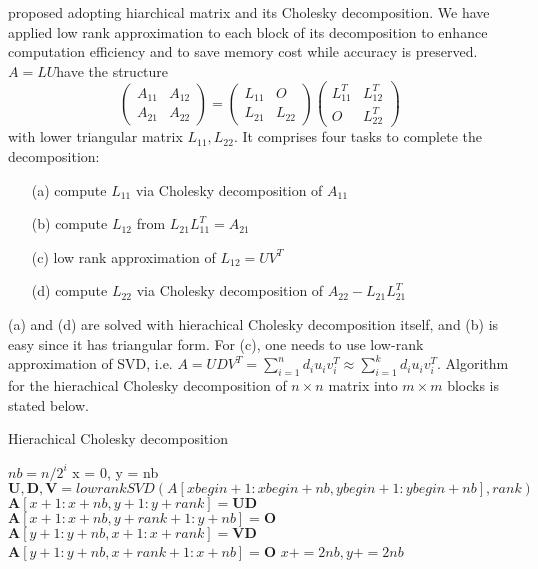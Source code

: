 \citet{hackbusch2015hierarchical} proposed adopting hiarchical matrix and its Cholesky decomposition. We have applied low rank approximation to each block of its decomposition to enhance computation efficiency and to save memory cost while accuracy is preserved.
$A=LU$have the structure
$$\begin{pmatrix}A_{11}&A_{12}\\A_{21}&A_{22}\end{pmatrix}=\begin{pmatrix}L_{11}&O\\L_{21}&L_{22}\end{pmatrix}\begin{pmatrix}L_{11}^T&L_{12}^T\\O&L_{22}^T\end{pmatrix}$$
with lower triangular matrix $L_{11},L_{22}$.
It comprises four tasks to complete the decomposition:
\begin{itemize}
	\item[(a)] compute $L_{11}$ via Cholesky decomposition of $A_{11}$
	\item[(b)] compute $L_{12}$ from $L_{21}L_{11}^T = A_{21}$
	\item[(c)] low rank approximation of $L_{12}=UV^T$
	\item[(d)] compute $L_{22}$ via Cholesky decomposition of $A_{22}-L_{21}L_{21}^T$
\end{itemize}
(a) and (d) are solved with hierachical Cholesky decomposition itself, and (b) is easy since it has triangular form. For (c), one needs to use low-rank approximation of SVD, i.e. $A=UDV^T=\sum_{i=1}^n d_i u_iv_i^T\approx\sum_{i=1}^k d_i u_iv_i^T$.
Algorithm for the hierachical Cholesky decomposition of $n\times n$ matrix into $m\times m$ blocks is stated below.
\begin{algorithm}[ht]
	\caption{Hierachical Cholesky decomposition}
	\begin{algorithmic}[1]
		\State $nb = n/2^i$
		\State x = 0, y = nb
		\State $\mathbf{U,D,V} = lowrankSVD(A[xbegin+1:xbegin+nb,ybegin+1:ybegin+nb], rank)$
		\State $\mathbf{A}[x + 1:x + nb, y + 1:y + rank] = \mathbf{UD}$
		\State $\mathbf{A}[x + 1:x + nb, y + rank+1:y + nb] = \mathbf{O}$
		\State $\mathbf{A}[y + 1:y + nb, x + 1:x + rank] = \mathbf{VD}$
		\State $\mathbf{A}[y + 1:y + nb, x + rank+1:x + nb] = \mathbf{O}$
		\State $x += 2nb, y += 2nb$
		\EndFor
		\EndFor
		\EndProcedure
		
	\end{algorithmic}\label{alg:hchol}
\end{algorithm}


